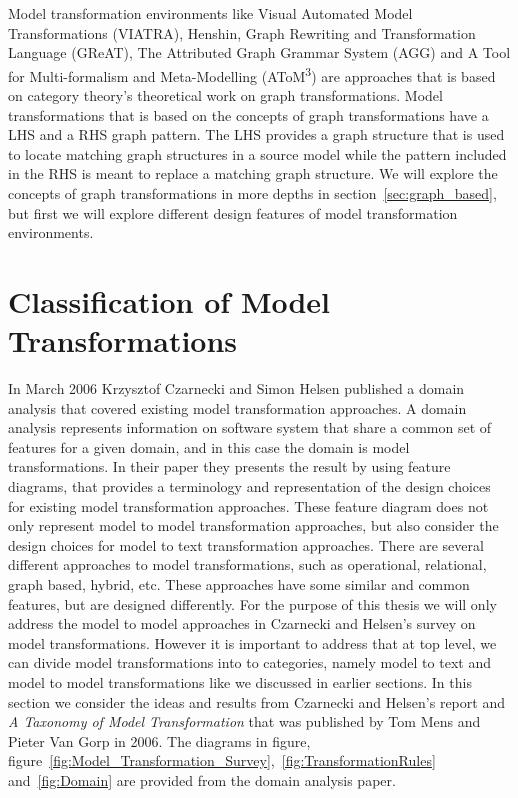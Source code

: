 Model transformation environments like Visual Automated Model
Transformations\cite{viatra2002} (VIATRA), Henshin\cite{Henshin_2010}, Graph
Rewriting and Transformation Language\cite{great2007} (GReAT), The Attributed
Graph Grammar System\cite{Taentzer2004} (AGG) and A Tool for Multi-formalism and
Meta-Modelling\cite{de2002atom3} (AToM\textsuperscript{3}) are approaches that
is based on category theory's theoretical work on graph transformations.
Model transformations that is based on the concepts of graph transformations
have a LHS and a RHS graph pattern. The LHS provides a graph structure that is
used to locate matching graph structures in a source model while the pattern
included in the RHS is meant to replace a matching graph structure. We will
explore the concepts of graph transformations in more depths in
section~\ref{sec:graph_based}, but first we will explore different design
features of model transformation environments.


\section{Classification of Model Transformations}

In March 2006 Krzysztof Czarnecki and Simon Helsen published a domain analysis
that covered existing model transformation approaches\cite{Czarnecki2006}. A
domain analysis represents information on software system that share a common set of
features for a given domain\cite{FODA,Prieto-Diaz1990}, and in this case the
domain is model transformations. In their paper they presents the result by using feature
diagrams, that provides a terminology and representation of the design choices
for existing model transformation approaches. These feature diagram does not
only represent model to model transformation approaches, but also consider the
design choices for model to text transformation approaches. There are several
different approaches to model transformations, such as operational,
relational, graph based, hybrid, etc. These approaches have some similar and
common features, but are designed differently. For the purpose of this thesis we
will only address the model to model approaches in Czarnecki and Helsen's
survey on model transformations. However it is important to address that at top
level, we can divide model transformations into to categories, namely model to
text and model to model transformations like we discussed in earlier sections.
In this section we consider the ideas and results from Czarnecki and Helsen's
report and \textit{A Taxonomy of Model Transformation}\cite{Mens2006} that was
published by Tom Mens and Pieter Van Gorp in 2006. The diagrams in figure,
figure~\ref{fig:Model_Transformation_Survey},~\ref{fig:TransformationRules}
and~\ref{fig:Domain} are provided from the domain analysis
paper\cite{Czarnecki2006}.
 
